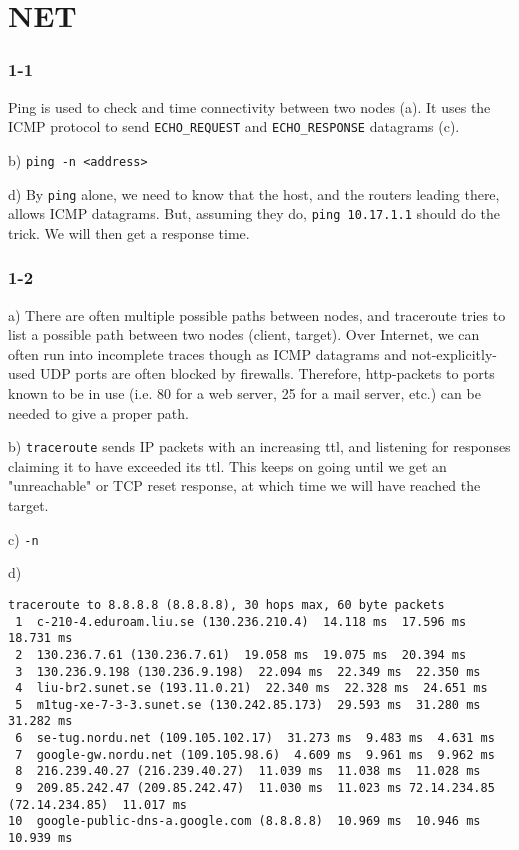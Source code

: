 
\chapter{NET}
\subsection{1-1}
Ping is used to check and time connectivity between two nodes (a). It uses the ICMP protocol to send \verb=ECHO_REQUEST= and \verb=ECHO_RESPONSE= datagrams (c).

b) \verb=ping -n <address>=

d) By \verb=ping= alone, we need to know that the host, and the routers leading there, allows ICMP datagrams. But, assuming they do,
\verb=ping 10.17.1.1= should do the trick. We will then get a response time.

\subsection{1-2}
a) There are often multiple possible paths between nodes, and traceroute tries to list a possible path between two nodes (client, target). Over Internet, we can often run into incomplete traces though as ICMP datagrams and not-explicitly-used UDP ports are often blocked by firewalls. Therefore, http-packets to ports known to be in use (i.e. 80 for a web server, 25 for a mail server, etc.) can be needed to give a proper path.

b) \verb=traceroute= sends IP packets with an increasing ttl, and listening for responses claiming it to have exceeded its ttl. This keeps on going until we get an "unreachable" or TCP reset response, at which time we will have reached the target.

c) \verb=-n=

d) \begin{verbatim}traceroute to 8.8.8.8 (8.8.8.8), 30 hops max, 60 byte packets
 1  c-210-4.eduroam.liu.se (130.236.210.4)  14.118 ms  17.596 ms  18.731 ms
 2  130.236.7.61 (130.236.7.61)  19.058 ms  19.075 ms  20.394 ms
 3  130.236.9.198 (130.236.9.198)  22.094 ms  22.349 ms  22.350 ms
 4  liu-br2.sunet.se (193.11.0.21)  22.340 ms  22.328 ms  24.651 ms
 5  m1tug-xe-7-3-3.sunet.se (130.242.85.173)  29.593 ms  31.280 ms  31.282 ms
 6  se-tug.nordu.net (109.105.102.17)  31.273 ms  9.483 ms  4.631 ms
 7  google-gw.nordu.net (109.105.98.6)  4.609 ms  9.961 ms  9.962 ms
 8  216.239.40.27 (216.239.40.27)  11.039 ms  11.038 ms  11.028 ms
 9  209.85.242.47 (209.85.242.47)  11.030 ms  11.023 ms 72.14.234.85 (72.14.234.85)  11.017 ms
10  google-public-dns-a.google.com (8.8.8.8)  10.969 ms  10.946 ms  10.939 ms
\end{verbatim}

